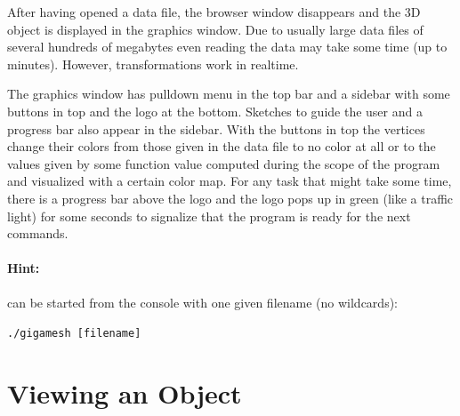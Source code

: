After having opened a data file, the browser window disappears and the 3D object is displayed in the graphics window. 
Due to usually large data files of several hundreds of megabytes even reading the data may take some time (up to minutes). 
However, transformations work in realtime.

The graphics window has pulldown menu in the top bar and a sidebar with some buttons in top and the \GigaMesh logo at the bottom. 
Sketches to guide the user and a progress bar also appear in the sidebar. 
With the buttons in top the vertices change their colors from those given in the data file to no color at all or to the values given by some function value computed during the scope of the program and visualized with a certain color map.
For any task that might take some time, there is a progress bar above the logo and the \GigaMesh logo pops up in green (like a traffic light) for some seconds to signalize that the program is ready for the next commands.

\paragraph{Hint:} \GigaMesh can be started from the console with one given filename (no wildcards):
\begin{center}
	{\tt ./gigamesh [filename]} 
\end{center}

\newpage
\section{Viewing an Object}
\label{sec:viewing}

